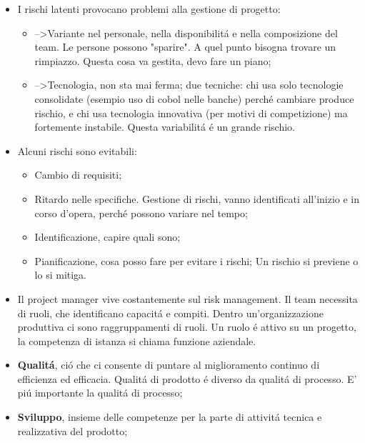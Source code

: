 \documentclass[a4paper,10pt] {article}
\begin{document}
\begin{itemize}
\begin{itemize}
	\item I rischi latenti provocano problemi alla gestione di progetto:
	\begin{itemize}
		\item -->Variante nel personale, nella disponibilit\'a e nella 
		composizione del team. 
		Le persone possono	"sparire". A quel punto bisogna trovare un 
		rimpiazzo. Questa cosa va gestita, 
		devo fare un piano;
		
		\item -->Tecnologia, non sta mai ferma; due tecniche: chi usa solo 
		tecnologie consolidate (esempio uso di cobol nelle banche) perch\'e 
		cambiare produce rischio, e chi usa tecnologia 
		innovativa (per motivi di competizione) ma fortemente instabile. Questa 
		variabilit\'a \'e un grande rischio.
	\end{itemize}
		\item Alcuni rischi sono evitabili:
		\begin{itemize}
		\item Cambio di requisiti;
		
		\item Ritardo nelle specifiche.
		Gestione di rischi, vanno identificati all'inizio e in corso d'opera, 
		perch\'e possono variare nel tempo; 
		
		\item Identificazione, capire quali sono;
		
		\item Pianificazione, cosa posso fare per evitare i rischi;
		Un rischio si previene o lo si mitiga.	
		\end{itemize}
		


\item Il project manager vive costantemente sul risk management.
Il team necessita di ruoli, che identificano capacit\'a e compiti. Dentro 
un'organizzazione produttiva ci sono raggruppamenti di ruoli. Un ruolo \'e 
attivo su un progetto, la competenza di istanza si chiama funzione aziendale.

\item \textbf{Qualit\'a}, ci\'o che ci consente di puntare al miglioramento 
continuo di efficienza ed efficacia. Qualit\'a di prodotto \'e diverso da 
qualit\'a di processo. E' pi\'u importante la qualit\'a di 
processo;

\item \textbf{Sviluppo}, insieme delle competenze per la parte di attivit\'a 
tecnica e realizzativa del prodotto;


\end{itemize}
\end{itemize}
\end{document}
